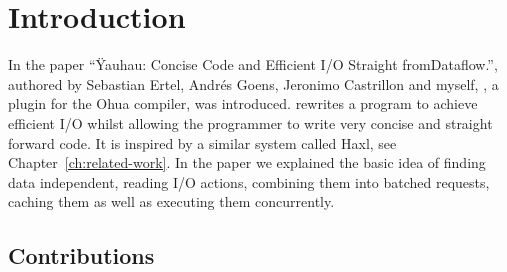 \chapter{Introduction}

\label{ch:Intro}



In the paper ``Ÿauhau: Concise Code and Efficient I/O Straight from\-Dataflow.''\cite{ErtelGoensAdamEtAl2016}, authored by Sebastian Ertel, Andrés Goens, Jeronimo Castrillon and myself, \yauhau{}, a plugin for the Ohua\cite{Ertel:2015:OID:2807426.2807431}\cite{Ohua:library:link} compiler, was introduced.
\yauhau{} rewrites a program to achieve efficient I/O whilst allowing the programmer to write very concise and straight forward code.
It is inspired by a similar system called Haxl, see Chapter~\ref{ch:related-work}.
In the paper we explained the basic idea of finding data independent, reading I/O actions, combining them into batched requests, caching them as well as executing them concurrently.

\section{Contributions}

